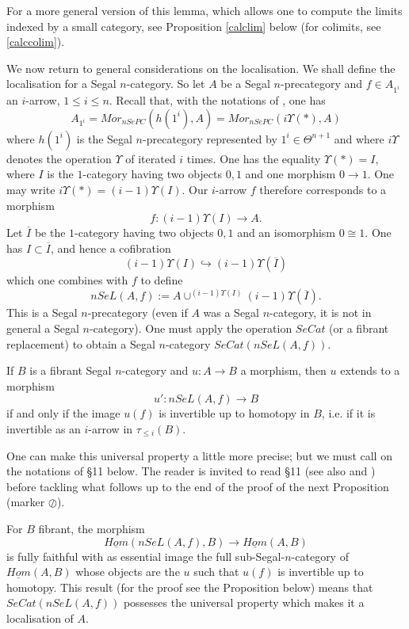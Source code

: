 For a more general version of this lemma, which allows one to compute the
limits indexed by a small category, see Proposition \ref{calclim}
below (for colimits, see \ref{calccolim}).


We now return to general considerations on the
localisation.
We shall define the localisation for a Segal $n$-category. So let
$A$ be a Segal $n$-precategory and $f\in  A_{1^i}$ an $i$-arrow, $1\leq i\leq
n$. Recall that, with the notations of \cite{limits}, one has
$$
A_{1^i} = Mor _{nSePC}(h(1^i),A)
=Mor _{nSePC}(i\Upsilon (\ast ),A)
$$
where $h(1^i)$ is the Segal $n$-precategory represented by $1^i\in \Theta
^{n+1}$
and where
$i\Upsilon$ denotes the operation $\Upsilon$ of \cite{limits} iterated $i$
times. One has the equality $\Upsilon (\ast )=  I$, where $I$
is the $1$-category having two objects
$0,1$ and one morphism $0\rightarrow 1$.
One may write $i\Upsilon (\ast ) = (i-1)\Upsilon (I)$. Our
$i$-arrow $f$
therefore corresponds to a morphism
$$
f: (i-1)\Upsilon (I)\rightarrow A.
$$
Let $\overline{I}$ be the $1$-category having two
objects $0,1$ and an isomorphism $0\cong 1$. One has $I\subset \overline{I}$,
and hence a cofibration
$$
(i-1)\Upsilon (I)\hookrightarrow
(i-1)\Upsilon (\overline{I})
$$
which one combines with $f$ to define
$$
nSeL(A, f) := A \cup ^{ (i-1)\Upsilon (I)}(i-1)\Upsilon
(\overline{I}).
$$
This is a Segal $n$-precategory (even if $A$ was a Segal $n$-category, it is not
in general a
Segal $n$-category). One must apply the operation $SeCat$ (or a
fibrant replacement) to obtain a Segal $n$-category
$SeCat(nSeL(A, f))$.


If $B$ is a fibrant Segal $n$-category and $u:A\rightarrow B$ a
morphism, then $u$ extends to a morphism
$$
u':  nSeL(A, f) \rightarrow B
$$
if and only if the image $u(f)$ is invertible
up to homotopy in $B$, i.e. if it is invertible as an $i$-arrow
in $\tau
_{\leq i}(B)$.


One can make this universal property a little more precise; but we must
call
on the notations of \S 11 below. The reader is invited
to read \S 11 (see also \cite{nCAT} and
\cite{limits}) before tackling what follows
up to the end of the proof of the next Proposition (marker
$\oslash$).

For $B$ fibrant, the morphism
$$
\underline{Hom}(nSeL(A, f), B)\rightarrow
\underline{Hom}(A, B)
$$
is fully faithful with as essential image the
full sub-Segal-$n$-category of $\underline{Hom}(A, B)$ whose objects
are the $u$ such that $u(f)$ is invertible up to homotopy. This result
(for the proof see the Proposition below) means that
$SeCat(nSeL(A, f))$ possesses the universal property which makes it a
localisation of $A$.

